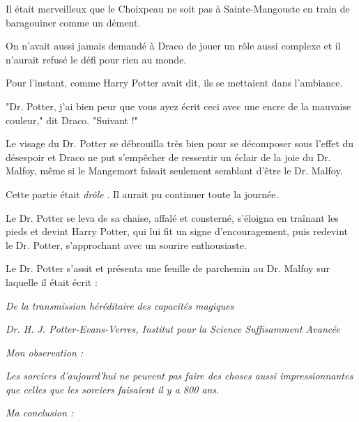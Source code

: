 Il était merveilleux que le Choixpeau ne soit pas à Sainte-Mangouste en train de baragouiner comme un dément.

On n'avait aussi jamais demandé à Draco de jouer un rôle aussi complexe et il n'aurait refusé le défi pour rien au monde.

Pour l'instant, comme Harry Potter avait dit, ils se mettaient dans l'ambiance.

"Dr. Potter, j'ai bien peur que vous ayez écrit ceci avec une encre de la mauvaise couleur," dit Draco. "Suivant !"

Le visage du Dr. Potter se débrouilla très bien pour se décomposer sous l'effet du désespoir et Draco ne put s'empêcher de ressentir un éclair de la joie du Dr. Malfoy, même si le Mangemort faisait seulement semblant d'être le Dr. Malfoy.

Cette partie était \emph{drôle} . Il aurait pu continuer toute la journée.

Le Dr. Potter se leva de sa chaise, affalé et consterné, s'éloigna en traînant les pieds et devint Harry Potter, qui lui fit un signe d'encouragement, puis redevint le Dr. Potter, s'approchant avec un sourire enthousiaste.

Le Dr. Potter s'assit et présenta une feuille de parchemin au Dr. Malfoy sur laquelle il était écrit :


\begin{center}\emph{De la transmission héréditaire des capacités magiques} \end{center}



\begin{center}\emph{Dr. H. J. Potter-Evans-Verres, Institut pour la Science Suffisamment Avancée} \end{center}



\begin{center}\emph{Mon observation :} \end{center}



\begin{center}\emph{Les sorciers d'aujourd'hui ne peuvent pas faire des choses aussi impressionnantes que celles que les sorciers faisaient il y a 800 ans.} \end{center}



\begin{center}\emph{Ma conclusion :} \end{center}



